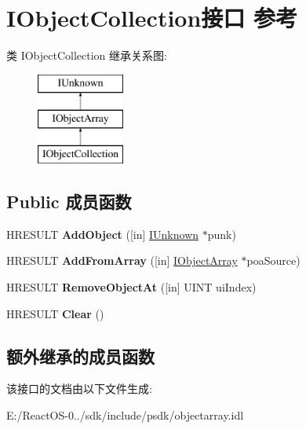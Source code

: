 \hypertarget{interface_i_object_collection}{}\section{I\+Object\+Collection接口 参考}
\label{interface_i_object_collection}
类 I\+Object\+Collection 继承关系图\+:\begin{figure}[H]
\begin{center}
\leavevmode
\includegraphics[height=3.000000cm]{interface_i_object_collection}
\end{center}
\end{figure}
\subsection*{Public 成员函数}
\begin{DoxyCompactItemize}
\item 
\mbox{\label{interface_i_object_collection_afde66b7b3fbe2203a1cc163288b91a6f}} 
H\+R\+E\+S\+U\+LT {\bfseries Add\+Object} (\mbox{[}in\mbox{]} \hyperlink{interface_i_unknown}{I\+Unknown} $\ast$punk)
\item 
\mbox{\label{interface_i_object_collection_a7e10028f14837139ed78bd1d446688a1}} 
H\+R\+E\+S\+U\+LT {\bfseries Add\+From\+Array} (\mbox{[}in\mbox{]} \hyperlink{interface_i_object_array}{I\+Object\+Array} $\ast$poa\+Source)
\item 
\mbox{\label{interface_i_object_collection_af836157d8b2ff6d8d8a1961750adc1d0}} 
H\+R\+E\+S\+U\+LT {\bfseries Remove\+Object\+At} (\mbox{[}in\mbox{]} U\+I\+NT ui\+Index)
\item 
\mbox{\label{interface_i_object_collection_a840ea7d77b8e4813c71e4ea2f421a6a1}} 
H\+R\+E\+S\+U\+LT {\bfseries Clear} ()
\end{DoxyCompactItemize}
\subsection*{额外继承的成员函数}


该接口的文档由以下文件生成\+:\begin{DoxyCompactItemize}
\item 
E\+:/\+React\+O\+S-\/0../sdk/include/psdk/objectarray.\+idl\end{DoxyCompactItemize}
